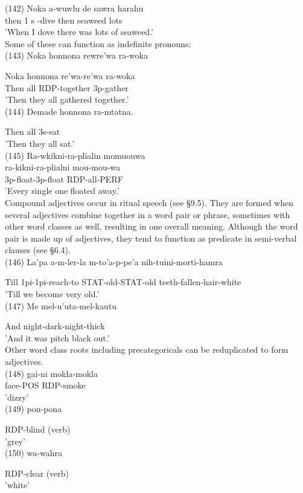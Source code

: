 \documentclass[10pt]{article}
\begin{document}
(142) Noka a-wuwlu de sawra harahu\\
then 1 s -dive then seaweed lots\\
'When I dove there was lots of seaweed.'\\
Some of these can function as indefinite pronouns:\\
(143) Noka honnona rewre'wa ra-woka

Noka honnona re'wa-re'wa ra-woka\\
Then all RDP-together 3p-gather\\
'Then they all gathered together.'\\
(144) Demade honnona ra-mtatna.

Then all 3s-sat\\
'Then they all sat.'\\
(145) Ra-wkikni-ra-plialin momuouwa\\
ra-kikni-ra-plialni mou-mou-wa\\
3p-float-3p-float RDP-all-PERF\\
'Every single one floated away.'\\
Compound adjectives occur in ritual speech (see §9.5). They are formed when several adjectives combine together in a word pair or phrase, sometimes with other word classes as well, resulting in one overall meaning. Although the word pair is made up of adjectives, they tend to function as predicate in semi-verbal clauses (see §6.4).\\
(146) La'pa a-m-ler-la m-to'a-p-pe'a nih-tuini-morti-hamra

Till 1pi-1pi-reach-to STAT-old-STAT-old teeth-fallen-hair-white\\
'Till we become very old.'\\
(147) Me mel-u'uta-mel-kautu

And night-dark-night-thick\\
'And it was pitch black out.'\\
Other word class roots including precategoricals can be reduplicated to form adjectives.\\
(148) gai-ni mokla-mokla\\
face-POS RDP-smoke\\
'dizzy'\\
(149) pon-pona

RDP-blind (verb)\\
'grey'\\
(150) wa-wahra

RDP-clear (verb)\\
'white'
\end{document}
